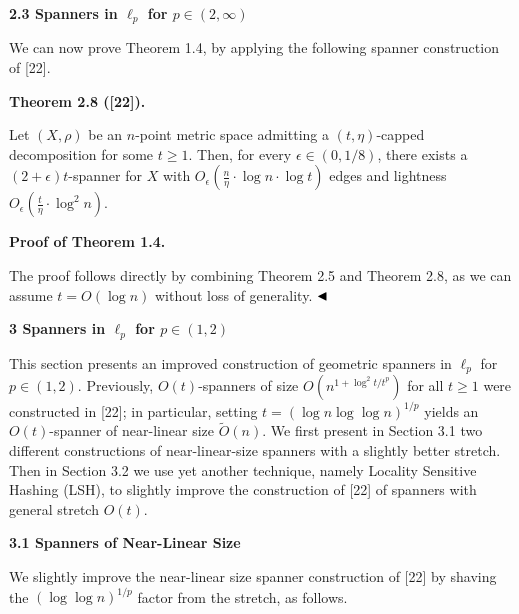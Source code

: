 \documentclass[10pt,a4paper]{amsart}
\begin{document}
\par
\par\medskip\noindent\textbf{2.3 Spanners in $\ell_{p}$ for $p\in(2,\infty)$}\par
We can now prove Theorem 1.4, by applying the following spanner construction of [22].
\par
\par
\par\medskip\noindent\textbf{Theorem 2.8 ([22]).}\par
Let $(X,\rho)$ be an $n$-point metric space admitting a $(t,\eta)$-capped decomposition for some $t\geq 1$. Then, for every $\epsilon\in(0,1/8)$, there exists a $(2+\epsilon)t$-spanner for $X$ with $O_{\epsilon}(\frac{n}{\eta}\cdot\log n\cdot\log t)$ edges and lightness $O_{\epsilon}(\frac{t}{\eta}\cdot\log^{2}n)$.
\par
\par
\par
\par\medskip\noindent\textbf{Proof of Theorem 1.4.}\par
The proof follows directly by combining Theorem 2.5 and Theorem 2.8, as we can assume $t=O(\log{n})$ without loss of generality. $\hfill\blacktriangleleft$
\par
\par
\par
\par
\par\medskip\noindent\textbf{3 Spanners in $\ell_{p}$ for $p\in(1,2)$}\par
This section presents an improved construction of geometric spanners in $\ell_{p}$ for $p\in(1,2)$. Previously, $O(t)$-spanners of size $O(n^{1+\log^{2}{t}/t^{p}})$ for all $t\geq 1$ were constructed in [22]; in particular, setting $t=(\log{n}\log{\log{n}})^{1/p}$ yields an $O(t)$-spanner of near-linear size $\tilde{O}(n)$. We first present in Section 3.1 two different constructions of near-linear-size spanners with a slightly better stretch. Then in Section 3.2 we use yet another technique, namely Locality Sensitive Hashing (LSH), to slightly improve the construction of [22] of spanners with general stretch $O(t)$.
\par
\par
\par\medskip\noindent\textbf{3.1 Spanners of Near-Linear Size}\par
We slightly improve the near-linear size spanner construction of [22] by shaving the $(\log\log{n})^{1/p}$ factor from the stretch, as follows.
\end{document}
